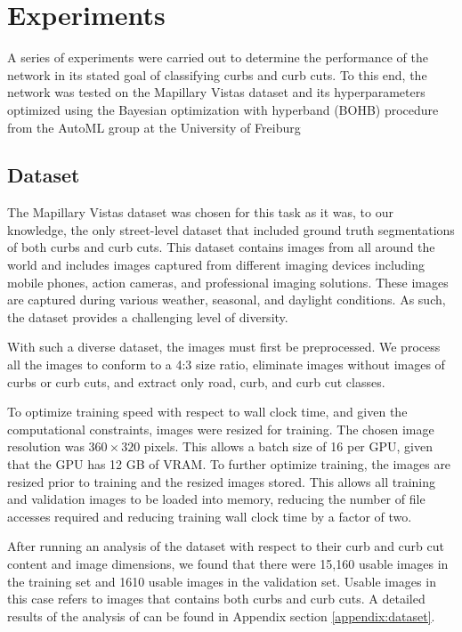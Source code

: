 \chapter{Experiments}\label{chap:experiments}
A series of experiments were carried out to determine the performance of the network in its stated goal of classifying curbs and curb cuts. To this end, the network was tested on the Mapillary Vistas dataset \cite{mapillary} and its hyperparameters optimized using the Bayesian optimization with hyperband (BOHB) procedure from the AutoML group at the University of Freiburg \cite{bohb}

\section{Dataset} \label{section:experiments-dataset}
The Mapillary Vistas dataset was chosen for this task as it was, to our knowledge, the only street-level dataset that included ground truth segmentations of both curbs and curb cuts.
This dataset contains images from all around the world and includes images captured from different imaging devices including mobile phones, action cameras, and professional imaging solutions.
These images are captured during various weather, seasonal, and daylight conditions.
As such, the dataset provides a challenging level of diversity.

With such a diverse dataset, the images must first be preprocessed.
We process all the images to conform to a 4:3 size ratio, eliminate images without images of curbs or curb cuts, and extract only road, curb, and curb cut classes.

To optimize training speed with respect to wall clock time, and given the computational constraints, images were resized for training.
The chosen image resolution was $360 \times 320$ pixels. 
This allows a batch size of 16 per GPU, given that the GPU has 12 GB of VRAM.
To further optimize training, the images are resized prior to training and the resized images stored.
This allows all training and validation images to be loaded into memory, reducing the number of file accesses required and reducing training wall clock time by a factor of two.

After running an analysis of the dataset with respect to their curb and curb cut content and image dimensions, we found that there were 15,160 usable images in the training set and 1610 usable images in the validation set.
Usable images in this case refers to images that contains both curbs and curb cuts.
A detailed results of the analysis of can be found in Appendix section \ref{appendix:dataset}.

